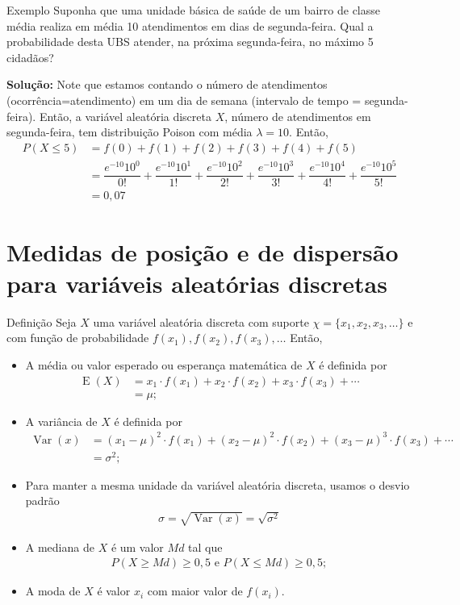 \documentclass[9pt]{beamer}
\DeclareMathOperator{\espe}{E}
\DeclareMathOperator{\vari}{Var}
\begin{document}
\begin{frame}{Exemplo}
Suponha que uma unidade básica de saúde de um bairro de classe média realiza em média 10 atendimentos em dias de segunda-feira. Qual a probabilidade desta UBS atender, na próxima segunda-feira, no máximo 5 cidadãos?
\vfill

\textbf{Solução:} Note que estamos contando o número de atendimentos (ocorrência=atendimento) em um dia de semana (intervalo de tempo = segunda-feira). Então, a variável aleatória discreta $X$, número de atendimentos em segunda-feira, tem distribuição Poison com média $\lambda = 10$. Então,
\begin{align*}
 P(X \leq 5) &= f(0) + f(1)+f(2)+f(3)+f(4)+f(5)\\
 &= \dfrac{e^{-10}10^0}{0!}+\dfrac{e^{-10}10^1}{1!}+\dfrac{e^{-10}10^2}{2!}+\dfrac{e^{-10}10^3}{3!}+\dfrac{e^{-10}10^4}{4!}+\dfrac{e^{-10}10^5}{5!}\\
 &= 0,07
\end{align*}

\end{frame}

\section{Medidas de posição e de dispersão para variáveis aleatórias discretas}

\begin{frame}{Definição}
  Seja $X$ uma variável aleatória discreta com suporte $\chi=\{x_1, x_2, x_3, \dots\}$ e com função de probabilidade $f(x_1), f(x_2), f(x_3), \dots$ Então,
  \begin{itemize}
   \item A média ou valor esperado ou esperança matemática de $X$ é definida por
   \begin{align*}
    \espe(X) &= x_1\cdot f(x_1) + x_2\cdot f(x_2) + x_3 \cdot f(x_3) + \cdots\\
    &= \mu;
   \end{align*}
   \item A variância de $X$ é definida por 
   \begin{align*}
    \vari(x) &= (x_1 - \mu)^2\cdot f(x_1) + (x_2 - \mu) ^2 \cdot f(x_2) + (x_3 - \mu)^3 \cdot f(x_3) + \cdots \\
    &= \sigma^2;
   \end{align*}
   \item Para manter a mesma unidade da variável aleatória discreta, usamos o desvio padrão
   \begin{align*}
    \sigma = \sqrt{\vari(x)} = \sqrt{\sigma^2}
   \end{align*}

   \item A mediana de $X$ é um valor $Md$ tal que
    \begin{align*}
     P(X \geq Md) \geq 0,5 \mbox{ e } P(X \leq Md) \geq 0,5;
    \end{align*}
  \item A moda de $X$ é valor $x_i$ com maior valor de $f(x_i)$.

  \end{itemize}


\end{frame}
 
\end{document}
